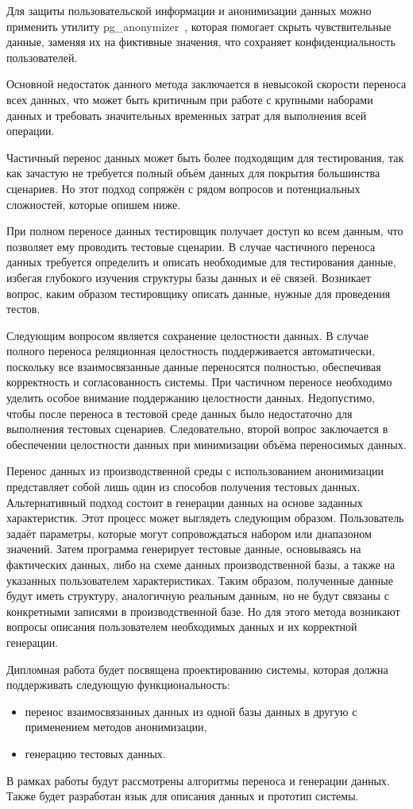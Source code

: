 Для защиты пользовательской информации и анонимизации данных можно применить утилиту pg\_anonymizer~\cite{pg-anonymizer}, которая помогает скрыть чувствительные данные, заменяя их на фиктивные значения, что сохраняет конфиденциальность пользователей.

Основной недостаток данного метода заключается в невысокой скорости переноса всех данных, что может быть критичным при работе с крупными наборами данных и требовать значительных временных затрат для выполнения всей операции.

Частичный перенос данных может быть более подходящим для тестирования, так как зачастую не требуется полный объём данных для покрытия большинства сценариев. Но этот подход сопряжён с рядом вопросов и потенциальных сложностей, которые опишем ниже.

При полном переносе данных тестировщик получает доступ ко всем данным, что позволяет ему проводить тестовые сценарии. В случае частичного переноса данных требуется определить и описать необходимые для тестирования данные, избегая глубокого изучения структуры базы данных и её связей. Возникает вопрос, каким образом тестировщику описать данные, нужные для проведения тестов.

Следующим вопросом является сохранение целостности данных. В случае полного переноса реляционная целостность поддерживается автоматически, поскольку все взаимосвязанные данные переносятся полностью, обеспечивая корректность и согласованность системы. При частичном переносе необходимо уделить особое внимание поддержанию целостности данных. Недопустимо, чтобы после переноса в тестовой среде данных было недостаточно для выполнения тестовых сценариев. Следовательно, второй вопрос заключается в обеспечении целостности данных при минимизации объёма переносимых данных.

Перенос данных из производственной среды с использованием анонимизации представляет собой лишь один из способов получения тестовых данных. Альтернативный подход состоит в генерации данных на основе заданных характеристик. Этот процесс может выглядеть следующим образом. Пользователь задаёт параметры, которые могут сопровождаться набором или диапазоном значений. Затем программа генерирует тестовые данные, основываясь на фактических данных, либо на схеме данных производственной базы, а также на указанных пользователем характеристиках. Таким образом, полученные данные будут иметь структуру, аналогичную реальным данным, но не будут связаны с конкретными записями в производственной базе. Но для этого метода возникают вопросы описания пользователем необходимых данных и их корректной генерации.

Дипломная работа будет посвящена проектированию системы, которая должна поддерживать следующую функциональность:
\begin{itemize}
    \item перенос взаимосвязанных данных из одной базы данных в другую с применением методов анонимизации,
    \item генерацию тестовых данных.
\end{itemize}
В рамках работы будут рассмотрены алгоритмы переноса и генерации данных. Также будет разработан язык для описания данных и прототип системы.
